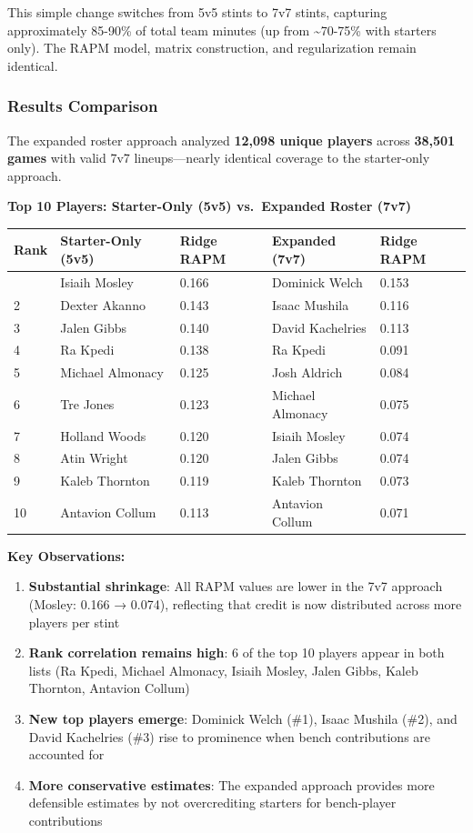 \documentclass[
  letterpaper,
  DIV=11,
  numbers=noendperiod]{scrartcl}
\providecommand{\tightlist}{%
  \setlength{\itemsep}{0pt}\setlength{\parskip}{0pt}}
\begin{document}
This simple change switches from 5v5 stints to 7v7 stints, capturing
approximately 85-90\% of total team minutes (up from
\textasciitilde70-75\% with starters only). The RAPM model, matrix
construction, and regularization remain identical.

\subsubsection{Results Comparison}\label{results-comparison}

The expanded roster approach analyzed \textbf{12,098 unique players}
across \textbf{38,501 games} with valid 7v7 lineups---nearly identical
coverage to the starter-only approach.

\textbf{Top 10 Players: Starter-Only (5v5) vs.~Expanded Roster (7v7)}

\begin{longtable}[]{@{}lllll@{}}
\toprule\noalign{}
Rank & Starter-Only (5v5) & Ridge RAPM & Expanded (7v7) & Ridge RAPM \\
\midrule\noalign{}
\endhead
\bottomrule\noalign{}
\endlastfoot
1 & Isiaih Mosley & 0.166 & Dominick Welch & 0.153 \\
2 & Dexter Akanno & 0.143 & Isaac Mushila & 0.116 \\
3 & Jalen Gibbs & 0.140 & David Kachelries & 0.113 \\
4 & Ra Kpedi & 0.138 & Ra Kpedi & 0.091 \\
5 & Michael Almonacy & 0.125 & Josh Aldrich & 0.084 \\
6 & Tre Jones & 0.123 & Michael Almonacy & 0.075 \\
7 & Holland Woods & 0.120 & Isiaih Mosley & 0.074 \\
8 & Atin Wright & 0.120 & Jalen Gibbs & 0.074 \\
9 & Kaleb Thornton & 0.119 & Kaleb Thornton & 0.073 \\
10 & Antavion Collum & 0.113 & Antavion Collum & 0.071 \\
\end{longtable}

\textbf{Key Observations:}

\begin{enumerate}
\def\labelenumi{\arabic{enumi}.}
\tightlist
\item
  \textbf{Substantial shrinkage}: All RAPM values are lower in the 7v7
  approach (Mosley: 0.166 → 0.074), reflecting that credit is now
  distributed across more players per stint
\item
  \textbf{Rank correlation remains high}: 6 of the top 10 players appear
  in both lists (Ra Kpedi, Michael Almonacy, Isiaih Mosley, Jalen Gibbs,
  Kaleb Thornton, Antavion Collum)
\item
  \textbf{New top players emerge}: Dominick Welch (\#1), Isaac Mushila
  (\#2), and David Kachelries (\#3) rise to prominence when bench
  contributions are accounted for
\item
  \textbf{More conservative estimates}: The expanded approach provides
  more defensible estimates by not overcrediting starters for
  bench-player contributions
\end{enumerate}
\end{document}
